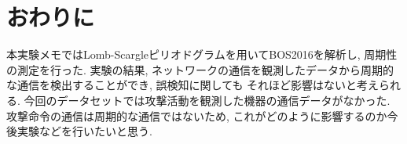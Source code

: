 \documentclass[twocolumn,10pt]{ltjsarticle}
\begin{document}
\section{おわりに}
本実験メモではLomb-Scargleピリオドグラムを用いてBOS2016を解析し, 周期性の測定を行った. 
実験の結果, ネットワークの通信を観測したデータから周期的な通信を検出することができ, 誤検知に関しても
それほど影響はないと考えられる. 
今回のデータセットでは攻撃活動を観測した機器の通信データがなかった. 
攻撃命令の通信は周期的な通信ではないため, これがどのように影響するのか今後実験などを行いたいと思う. 



\end{document}
